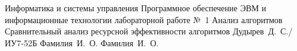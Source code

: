 \documentclass[14pt]{extarticle}
\begin{document}
\makereporttitle
    {Информатика и системы управления} %
    {Программное обеспечение ЭВМ и информационные технологии} %
    {лабораторной работе №~1} %
    {Анализ алгоритмов} %
    {Сравнительный анализ ресурсной эффективности алгоритмов} %
    {} %
    {Дудырев~Д.~С./ИУ7-52Б} %
    {Фамилия~И.~О.} %
    {Фамилия~И.~О.} %

% 
% 




\end{document}
